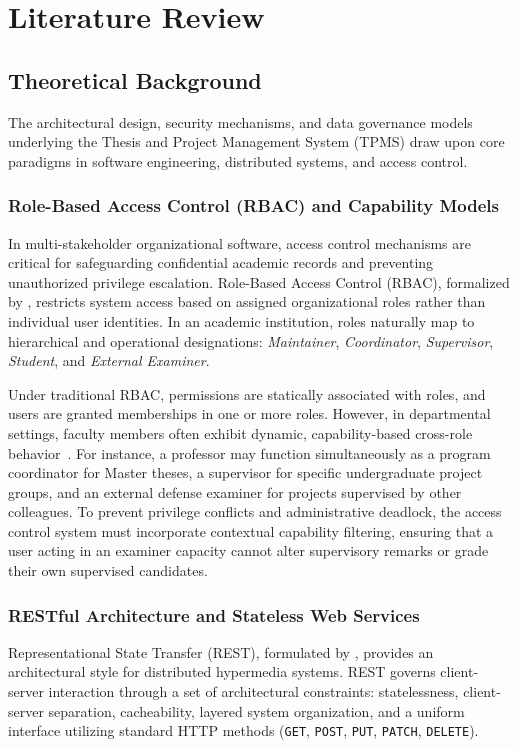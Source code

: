 \chapter{Literature Review}

\section{Theoretical Background}
The architectural design, security mechanisms, and data governance models underlying the Thesis and Project Management System (TPMS) draw upon core paradigms in software engineering, distributed systems, and access control.

\subsection{Role-Based Access Control (RBAC) and Capability Models}
In multi-stakeholder organizational software, access control mechanisms are critical for safeguarding confidential academic records and preventing unauthorized privilege escalation. Role-Based Access Control (RBAC), formalized by \citet{ferraiolo2007rbac}, restricts system access based on assigned organizational roles rather than individual user identities. In an academic institution, roles naturally map to hierarchical and operational designations: \textit{Maintainer}, \textit{Coordinator}, \textit{Supervisor}, \textit{Student}, and \textit{External Examiner}.

Under traditional RBAC, permissions are statically associated with roles, and users are granted memberships in one or more roles. However, in departmental settings, faculty members often exhibit dynamic, capability-based cross-role behavior~\citep{sommerville2016software}. For instance, a professor may function simultaneously as a program coordinator for Master theses, a supervisor for specific undergraduate project groups, and an external defense examiner for projects supervised by other colleagues. To prevent privilege conflicts and administrative deadlock, the access control system must incorporate contextual capability filtering, ensuring that a user acting in an examiner capacity cannot alter supervisory remarks or grade their own supervised candidates.

\subsection{RESTful Architecture and Stateless Web Services}
Representational State Transfer (REST), formulated by \citet{fielding2000architectural}, provides an architectural style for distributed hypermedia systems. REST governs client-server interaction through a set of architectural constraints: statelessness, client-server separation, cacheability, layered system organization, and a uniform interface utilizing standard HTTP methods (\texttt{GET}, \texttt{POST}, \texttt{PUT}, \texttt{PATCH}, \texttt{DELETE}).

